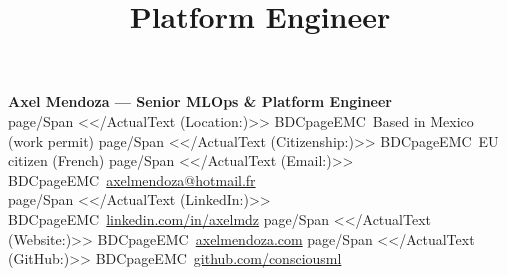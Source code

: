 \documentclass[10pt,a4paper,sans]{moderncv}
\title{Platform Engineer}
\newcommand{\labelicon}[2]{\pdfliteral page{/Span <</ActualText (#1:)>> BDC}#2\pdfliteral page{EMC}}
\begin{document}
\begin{center}
    {\fontsize{22}{26}\bfseries\color{color1}Axel Mendoza \color{color0}--- Senior MLOps \& Platform Engineer}\\[4pt]
    {\color{color2}
    \labelicon{Location}{\faMapMarker*}~Based in Mexico (work permit)\quad
    \labelicon{Citizenship}{\faPassport}~EU citizen (French)\quad
    \labelicon{Email}{\faAt}~\href{mailto:axelmendoza@hotmail.fr}{axelmendoza@hotmail.fr}\\
    \labelicon{LinkedIn}{\faLinkedin}~\href{https://www.linkedin.com/in/axelmdz}{linkedin.com/in/axelmdz}\quad
    \labelicon{Website}{\faBlog}~\href{https://www.axelmendoza.com}{axelmendoza.com}\quad
    \labelicon{GitHub}{\faGithub}~\href{https://www.github.com/consciousml}{github.com/consciousml}}
\end{center}
\end{document}
